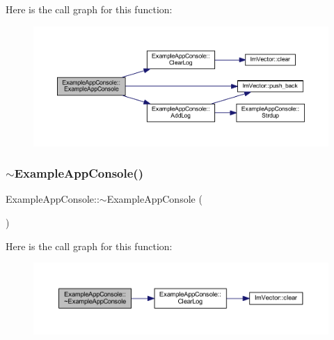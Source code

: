 Here is the call graph for this function\+:
\nopagebreak
\begin{figure}[H]
\begin{center}
\leavevmode
\includegraphics[width=350pt]{struct_example_app_console_a405521e6aa8f97954b67315baf8d6147_cgraph}
\end{center}
\end{figure}
\mbox{\label{struct_example_app_console_a91ef200056f867cf97a57db91bb991c4}} 
\subsubsection{\texorpdfstring{$\sim$\+Example\+App\+Console()}{~ExampleAppConsole()}}
{\footnotesize\ttfamily Example\+App\+Console\+::$\sim$\+Example\+App\+Console (\begin{DoxyParamCaption}{ }\end{DoxyParamCaption})\hspace{0.3cm}{\ttfamily [inline]}}

Here is the call graph for this function\+:
\nopagebreak
\begin{figure}[H]
\begin{center}
\leavevmode
\includegraphics[width=350pt]{struct_example_app_console_a91ef200056f867cf97a57db91bb991c4_cgraph}
\end{center}
\end{figure}


